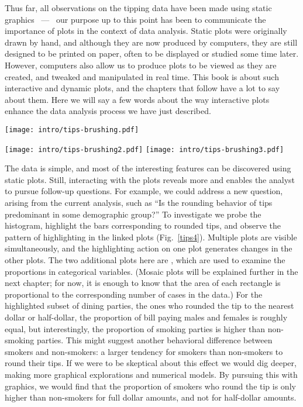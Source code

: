 Thus far, all observations on the tipping data have been made
using static graphics ~---~ our purpose up to this point has been to
communicate the importance of plots in the context of data analysis.
Static plots were originally drawn by hand, and although they are now
produced by computers, they are still designed to be printed on paper,
often to be displayed or studied some time later.  However, computers
also allow us to produce plots to be viewed as they are created, and
tweaked and manipulated in real time.  This book is about such
interactive and dynamic plots, and the chapters that follow have a lot
to say about them.  Here we will say a few words about the way
interactive plots enhance the data analysis process we have just
described.

\begin{figure*}[htp]
\centerline{\texttt{[image: intro/tips-brushing.pdf]}}
\centerline{{\texttt{[image: intro/tips-brushing2.pdf]}}
    {\texttt{[image: intro/tips-brushing3.pdf]}}}
\caption[Histogram of  linked to 2D mosaic plots of 
and ]{Histogram of  linked to 2D mosaic plots of
 and .  Bars of whole and half-dollar amounts are
highlighted.  The proportion of smoking parties who round their tips
is higher than that of non-smoking parties, whereas men and women round
about equally.}
\label{tips4}
\end{figure*}

The  data is simple, and most of the interesting features
can be discovered using static plots. Still, interacting with the
plots reveals more and enables the analyst to pursue follow-up
questions. For example, we could address a new question, arising from
the current analysis, such as ``Is the rounding behavior of tips
predominant in some demographic group?''  To investigate we probe the
histogram, highlight the bars corresponding to rounded tips, and
observe the pattern of highlighting in the linked plots
(Fig.~\ref{tips4}). Multiple plots are visible simultaneously, and the
highlighting action on one plot generates changes in the other plots.
The two additional plots here are ,  which are used to examine the proportions in categorical variables.
(Mosaic plots will be explained further in the next chapter; for now,
it is enough to know that the area of each rectangle is proportional
to the corresponding number of cases in the data.)  For the
highlighted subset of dining parties, the ones who rounded the tip to
the nearest dollar or half-dollar, the proportion of bill paying males
and females is roughly equal, but interestingly, the proportion of
smoking parties is higher than non-smoking parties. This might suggest
another behavioral difference between smokers and non-smokers: a
larger tendency for smokers than non-smokers to round their tips. If
we were to be skeptical about this effect we would dig deeper, making
more graphical explorations and numerical models. By pursuing this
with graphics, we would find that the proportion of smokers who round the
tip is only higher than non-smokers for full dollar amounts, and not
for half-dollar amounts.

